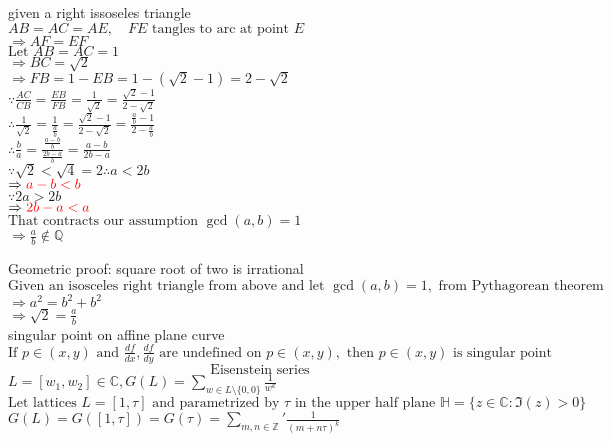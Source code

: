 \documentclass[10pt]{article}
\begin{document}
given a right issoseles triangle\\
$AB = AC = AE, \quad FE \text{  tangles to arc at point } E $\\
$\Rightarrow AF = EF$\\
$\text{Let } AB = AC = 1$\\
$\Rightarrow BC = \sqrt{2}$\\
$\Rightarrow FB = 1-EB = 1-(\sqrt{2} - 1) = 2-\sqrt{2}$\\
$\because \frac{AC}{CB} = \frac{EB}{FB} = \frac{1}{\sqrt{2}} = \frac{\sqrt{2}-1}{2-\sqrt{2}}$\\
$\therefore \frac{1}{\sqrt{2}} =\frac{1}{\frac{a}{b}} = \frac{\sqrt{2}-1}{2-\sqrt{2}} = \frac{\frac{a}{b} - 1}{2-\frac{a}{b}}$\\
$\therefore \frac{b}{a} = \frac{ \frac{a-b}{b} } {\frac{2b - a}{b}} = \frac{a-b}{2b-a}$\\
$\because \sqrt{2} < \sqrt{4} = 2 \therefore  a < 2b $\\
$\Rightarrow  \color{red} a-b < b $\\
$\because 2a > 2b$\\
$\Rightarrow  \color{red}2b -a < a$\\
$\text{That contracts our assumption } \gcd(a, b) = 1$\\
$\Rightarrow \frac{a}{b} \notin \mathbb{Q}$

\pagebreak
\noindent
Geometric proof: square root of two is irrational\\
$\text{Given an isosceles right triangle from above and let } \gcd(a, b)=1, \text{ from Pythagorean theorem}$\\
$\Rightarrow a^2 = b^2 + b^2$\\
$\Rightarrow \sqrt{2} = \frac{a}{b}$\\

singular point on affine plane curve\\
$\text{If } p \in (x, y) \text{ and } \frac{df}{dx}, \frac{df}{dy} \text{ are undefined on } p \in (x, y), \text{ then } p\in (x, y) \text{ is singular point}$\\


\[\text{Eisenstein series}\]
$L = [w_1, w_2] \in \mathbb{C}, G(L) = \sum_{w\in L\setminus \{0, 0\}} \frac{1}{w^k}$\\
$\text{Let lattices } L=[1, \tau] \text{ and parametrized by }\tau  \text{ in the upper half plane } \mathbb{H} = \{ z \in\mathbb{C} : \Im(z) > 0 \} $\\
$G(L) = G([1, \tau]) =G(\tau) = \sum_{m, n \in \mathbb{Z}}' \frac{1}{(m+n\tau)^k}$\\
\end{document}
